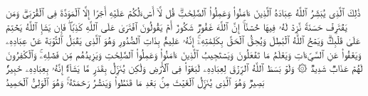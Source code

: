 \stopbuffer
\startbuffer[\q:42:23]
ذَٰلِكَ ٱلَّذِی یُبَشِّرُ ٱللَّهُ عِبَادَهُ ٱلَّذِینَ ءَامَنُوا۟ وَعَمِلُوا۟ ٱلصَّٰلِحَٰتِۗ قُل لَّاۤ أَسۡءَلُكُمۡ عَلَیۡهِ أَجۡرًا إِلَّا ٱلۡمَوَدَّةَ فِی ٱلۡقُرۡبَىٰۗ وَمَن یَقۡتَرِفۡ حَسَنَةࣰ نَّزِدۡ لَهُۥ فِیهَا حُسۡنًاۚ إِنَّ ٱللَّهَ غَفُورࣱ شَكُورٌ%
\stopbuffer
\startbuffer[\q:42:24]
أَمۡ یَقُولُونَ ٱفۡتَرَىٰ عَلَى ٱللَّهِ كَذِبࣰاۖ فَإِن یَشَإِ ٱللَّهُ یَخۡتِمۡ عَلَىٰ قَلۡبِكَۗ وَیَمۡحُ ٱللَّهُ ٱلۡبَٰطِلَ وَیُحِقُّ ٱلۡحَقَّ بِكَلِمَٰتِهِۦۤۚ إِنَّهُۥ عَلِیمُۢ بِذَاتِ ٱلصُّدُورِ%
\stopbuffer
\startbuffer[\q:42:25]
وَهُوَ ٱلَّذِی یَقۡبَلُ ٱلتَّوۡبَةَ عَنۡ عِبَادِهِۦ وَیَعۡفُوا۟ عَنِ ٱلسَّیِّءَاتِ وَیَعۡلَمُ مَا تَفۡعَلُونَ%
\stopbuffer
\startbuffer[\q:42:26]
وَیَسۡتَجِیبُ ٱلَّذِینَ ءَامَنُوا۟ وَعَمِلُوا۟ ٱلصَّٰلِحَٰتِ وَیَزِیدُهُم مِّن فَضۡلِهِۦۚ وَٱلۡكَٰفِرُونَ لَهُمۡ عَذَابࣱ شَدِیدࣱ%
\stopbuffer
\startbuffer[\q:42:27]
۞ وَلَوۡ بَسَطَ ٱللَّهُ ٱلرِّزۡقَ لِعِبَادِهِۦ لَبَغَوۡا۟ فِی ٱلۡأَرۡضِ وَلَٰكِن یُنَزِّلُ بِقَدَرࣲ مَّا یَشَاۤءُۚ إِنَّهُۥ بِعِبَادِهِۦ خَبِیرُۢ بَصِیرࣱ%
\stopbuffer
\startbuffer[\q:42:28]
وَهُوَ ٱلَّذِی یُنَزِّلُ ٱلۡغَیۡثَ مِنۢ بَعۡدِ مَا قَنَطُوا۟ وَیَنشُرُ رَحۡمَتَهُۥۚ وَهُوَ ٱلۡوَلِیُّ ٱلۡحَمِیدُ%
\stopbuffer
